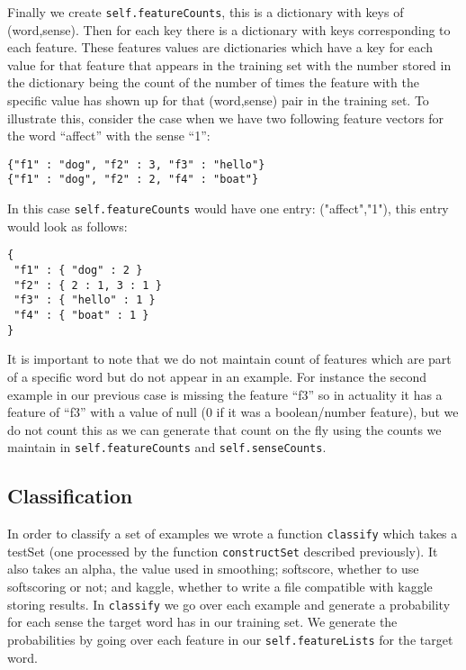 \documentclass{article}
\begin{document}
Finally we create \texttt{self.featureCounts}, this is a dictionary with keys of (word,sense). Then for each key there is a dictionary with keys corresponding to each feature. These features values are dictionaries which have a key for each value for that feature that appears in the training set with the number stored in the dictionary being the count of the number of times the feature with the specific value has shown up for that (word,sense) pair in the training set. To illustrate this, consider the case when we have two following feature vectors for the word ``affect'' with the sense ``1'':
{\small
\begin{verbatim}
{"f1" : "dog", "f2" : 3, "f3" : "hello"}
{"f1" : "dog", "f2" : 2, "f4" : "boat"}
\end{verbatim}
}
In this case \texttt{self.featureCounts} would have one entry: ("affect","1"), this entry would look as follows:
{\small
\begin{verbatim}
{
 "f1" : { "dog" : 2 }
 "f2" : { 2 : 1, 3 : 1 }
 "f3" : { "hello" : 1 }
 "f4" : { "boat" : 1 }
}
\end{verbatim}
}

It is important to note that we do not maintain count of features which are part of a specific word but do not appear in an example. For instance the second example in our previous case is missing the feature ``f3'' so in actuality it has a feature of ``f3'' with a value of null (0 if it was a boolean/number feature), but we do not count this as we can generate that count on the fly using the counts we maintain in \texttt{self.featureCounts} and \texttt{self.senseCounts}.

\subsection{Classification}

In order to classify a set of examples we wrote a function \texttt{classify} which takes a testSet (one processed by the function \texttt{constructSet} described previously). It also takes an alpha, the value used in smoothing; softscore, whether to use softscoring or not; and kaggle, whether to write a file compatible with kaggle storing results. In \texttt{classify} we go over each example and generate a probability for each sense the target word has in our training set. We generate the probabilities by going over each feature in our \texttt{self.featureLists} for the target word.
\end{document}
